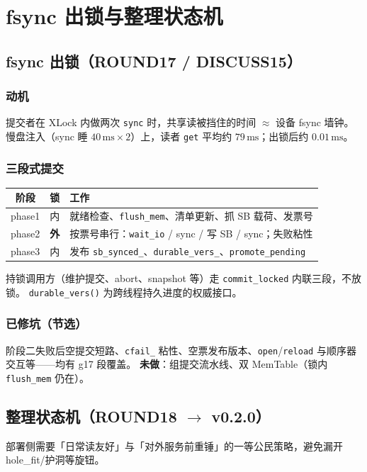 \section{fsync 出锁与整理状态机}
\label{sec:fsync-tidy}

\subsection{fsync 出锁（ROUND17 / DISCUSS15）}
\subsubsection{动机}
提交者在 XLock 内做两次 \texttt{sync} 时，共享读被挡住的时间 $\approx$ 设备 fsync 墙钟。
慢盘注入（sync 睡 $40\,\mathrm{ms}\times 2$）上，读者 \texttt{get} 平均约 $79\,\mathrm{ms}$；出锁后约 $0.01\,\mathrm{ms}$。

\subsubsection{三段式提交}
\begin{center}
\begin{tabular}{@{}clp{7.8cm}@{}}
\toprule
阶段 & 锁 & 工作 \\
\midrule
phase1 & 内 & 就绪检查、\texttt{flush\_mem}、清单更新、抓 SB 载荷、发票号 \\
phase2 & \textbf{外} & 按票号串行：\texttt{wait\_io} / sync / 写 SB / sync；失败粘性 \\
phase3 & 内 & 发布 \texttt{sb\_synced\_}、\texttt{durable\_vers\_}、\texttt{promote\_pending} \\
\bottomrule
\end{tabular}
\end{center}

持锁调用方（维护提交、abort、snapshot 等）走 \texttt{commit\_locked} 内联三段，不放锁。
\texttt{durable\_vers()} 为跨线程持久进度的权威接口。

\subsubsection{已修坑（节选）}
阶段二失败后空提交短路、\texttt{cfail\_} 粘性、空票发布版本、\texttt{open}/\texttt{reload} 与顺序器交互等——均有 g17 段覆盖。
\textbf{未做}：组提交流水线、双 MemTable（锁内 \texttt{flush\_mem} 仍在）。

\subsection{整理状态机（ROUND18 $\to$ v0.2.0）}
部署侧需要「日常读友好」与「对外服务前重锤」的一等公民策略，避免漏开 hole\_fit/护洞等旋钮。

